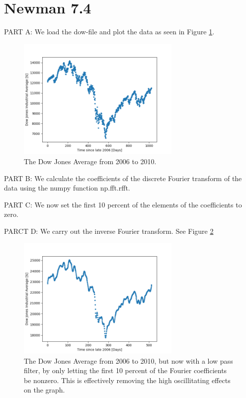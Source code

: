 \documentclass[11pt]{article}
\begin{document}
\section{Newman 7.4}
PART A: We load the dow-file and plot the data as seen in Figure \ref{dow}. 
\begin{figure}[!htbp]
    \centering
    \includegraphics[width=0.7\textwidth]{dow.png}
    \caption{The Dow Jones Average from 2006 to 2010.}
    \label{dow}
\end{figure}

PART B: We calculate the coefficients of the discrete Fourier transform of the data using the numpy function np.fft.rfft.

PART C: We now set the first 10 percent of the elements of the coefficients to zero.

PARCT D: We carry out the inverse Fourier transform. See Figure \ref{high}
\begin{figure}[!htbp]
    \centering
    \includegraphics[width=0.7\textwidth]{high_cut.png}
    \caption{The Dow Jones Average from 2006 to 2010, but now with a low pass filter, by only letting the first 10 percent of the Fourier coefficients be nonzero. This is effectively removing the high oscillitating effects on the graph. }
    \label{high}
\end{figure}
\end{document}
